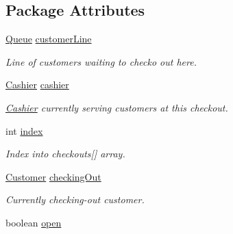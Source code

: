 \subsection*{Package Attributes}
\begin{CompactItemize}
\item 
\hypertarget{class_checkout_66f90b2bca04022a54e5179f8f60dd8b}{
\hyperlink{class_queue}{Queue} \hyperlink{class_checkout_66f90b2bca04022a54e5179f8f60dd8b}{customerLine}}
\label{class_checkout_66f90b2bca04022a54e5179f8f60dd8b}

\begin{CompactList}\small\item\em Line of customers waiting to checko out here. \item\end{CompactList}\item 
\hypertarget{class_checkout_5b3b71b8c2bbff1deb8481f7f29f0dbb}{
\hyperlink{class_cashier}{Cashier} \hyperlink{class_checkout_5b3b71b8c2bbff1deb8481f7f29f0dbb}{cashier}}
\label{class_checkout_5b3b71b8c2bbff1deb8481f7f29f0dbb}

\begin{CompactList}\small\item\em \hyperlink{class_cashier}{Cashier} currently serving customers at this checkout. \item\end{CompactList}\item 
\hypertarget{class_checkout_af3a8fb83f2076b69307234d7e8fe7e1}{
int \hyperlink{class_checkout_af3a8fb83f2076b69307234d7e8fe7e1}{index}}
\label{class_checkout_af3a8fb83f2076b69307234d7e8fe7e1}

\begin{CompactList}\small\item\em Index into checkouts\mbox{[}\mbox{]} array. \item\end{CompactList}\item 
\hypertarget{class_checkout_b715f220f3eae0111db07f5ef9e7e812}{
\hyperlink{class_customer}{Customer} \hyperlink{class_checkout_b715f220f3eae0111db07f5ef9e7e812}{checkingOut}}
\label{class_checkout_b715f220f3eae0111db07f5ef9e7e812}

\begin{CompactList}\small\item\em Currently checking-out customer. \item\end{CompactList}\item 
\hypertarget{class_checkout_d85ffcc88f238ab5d7f2b5f27558178d}{
boolean \hyperlink{class_checkout_d85ffcc88f238ab5d7f2b5f27558178d}{open}}
\label{class_checkout_d85ffcc88f238ab5d7f2b5f27558178d}


\end{CompactItemize}
